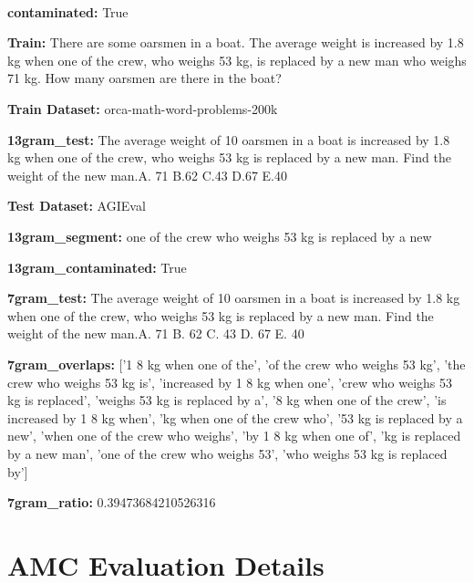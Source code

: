 \documentclass[11pt]{article}
\begin{document}
\begin{AIbox}{}
\tt \footnotesize
\begin{minipage}{0.99\textwidth}
\textbf{contaminated:} True

\textbf{Train:} There are some oarsmen in a boat. The average weight is increased by 1.8 kg when one of the crew, who weighs 53 kg, is replaced by a new man who weighs 71 kg. How many oarsmen are there in the boat?

\textbf{Train Dataset:}  orca-math-word-problems-200k

\textbf{13gram\_test:} The average weight of 10 oarsmen in a boat is increased by 1.8 kg when one of the crew, who weighs 53 kg is replaced by a new man. Find the weight of the new man.A. 71
B.62
C.43
D.67
E.40

\textbf{Test Dataset:} AGIEval

\textbf{13gram\_segment:} one of the crew who weighs 53 kg is replaced by a new

\textbf{13gram\_contaminated:} True

\textbf{7gram\_test:} The average weight of 10 oarsmen in a boat is increased by 1.8 kg when one of the crew, who weighs 53 kg is replaced by a new man. Find the weight of the new man.A. 71
B. 62
C. 43
D. 67
E. 40

\textbf{7gram\_overlaps:} ['1 8 kg when one of the', 'of the crew who weighs 53 kg', 'the crew who weighs 53 kg is', 'increased by 1 8 kg when one', 'crew who weighs 53 kg is replaced', 'weighs 53 kg is replaced by a', '8 kg when one of the crew', 'is increased by 1 8 kg when', 'kg when one of the crew who', '53 kg is replaced by a new', 'when one of the crew who weighs', 'by 1 8 kg when one of', 'kg is replaced by a new man', 'one of the crew who weighs 53', 'who weighs 53 kg is replaced by']

\textbf{7gram\_ratio:} 0.39473684210526316
\end{minipage}
\end{AIbox}


\section{AMC Evaluation Details}
\label{sec:amc-appendix-details}
\end{document}
